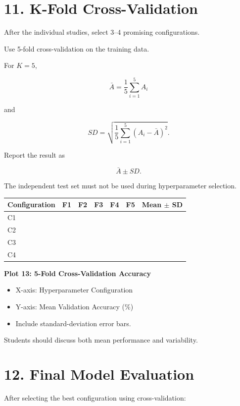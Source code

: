 \documentclass[10pt]{article}
\begin{document}
\section*{11. K-Fold Cross-Validation}

After the individual studies, select 3--4 promising configurations.

Use 5-fold cross-validation on the training data.

For $K=5$,

\[
\bar{A}=
\frac{1}{5}\sum_{i=1}^{5}A_i
\]

and

\[
SD=
\sqrt{
\frac{1}{5}
\sum_{i=1}^{5}(A_i-\bar{A})^2
}.
\]

Report the result as

\[
\boxed{\bar{A}\pm SD}.
\]

The independent test set must not be used during hyperparameter selection.

\begin{center}
\begin{tabular}{|l|c|c|c|c|c|c|}
\hline
Configuration & F1 & F2 & F3 & F4 & F5 & Mean $\pm$ SD\\
\hline
C1 & & & & & &\\
C2 & & & & & &\\
C3 & & & & & &\\
C4 & & & & & &\\
\hline
\end{tabular}
\end{center}

\textbf{Plot 13: 5-Fold Cross-Validation Accuracy}

\begin{itemize}
\item X-axis: Hyperparameter Configuration
\item Y-axis: Mean Validation Accuracy (\%)
\item Include standard-deviation error bars.
\end{itemize}

Students should discuss both mean performance and variability.

\section*{12. Final Model Evaluation}

After selecting the best configuration using cross-validation:
\end{document}
